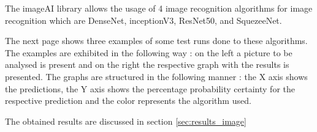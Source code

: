   The imageAI library allows the usage of 4 image recognition algorithms for image recognition which are DenseNet, inceptionV3, ResNet50, and SquezeeNet.

  The next page shows three examples of some test runs done to these algorithms. The examples are exhibited in the following way : on the left a  picture to be analysed is present and on the right the respective graph with the results is presented. The graphs are structured in the following manner : the X axis shows the predictions, the Y axis shows the percentage probability certainty for the respective prediction and the color represents the algorithm used.

  The obtained results are discussed in section \ref{sec:results_image}





\newpage



